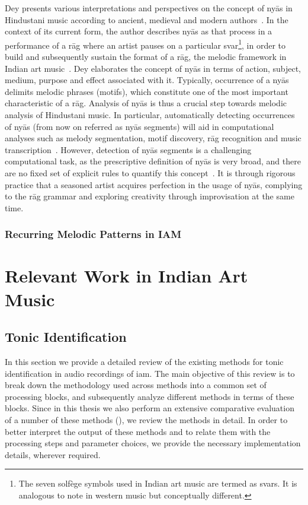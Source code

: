Dey presents various interpretations and perspectives on the concept of ny\={a}s in Hindustani music according to ancient, medieval and modern authors~\cite{Dey2008}. In the context of its current form, the author describes ny\={a}s as that process in a performance of a r\={a}g where an artist pauses on a particular svar\footnote{The seven solf\`{e}ge symbols used in Indian art music are termed as svars. It is analogous to note in western music but conceptually different.}, in order to build and subsequently sustain the format of a r\={a}g, the melodic framework in Indian art music~\cite[p. 70]{Dey2008}\cite{KKG_SS13}. Dey elaborates the concept of ny\={a}s in terms of action, subject, medium, purpose and effect associated with it. Typically, occurrence of a ny\={a}s delimits melodic phrases (motifs), which constitute one of the most important characteristic of a r\={a}g. Analysis of ny\={a}s is thus a crucial step towards melodic analysis of Hindustani music. In particular, automatically detecting occurrences of ny\={a}s (from now on referred as ny\={a}s segments) will aid in computational analyses such as melody segmentation, motif discovery, r\={a}g recognition and music transcription~\cite{GopalJNMR2012, Rao2014}. However, detection of ny\={a}s segments is a challenging computational task, as the prescriptive definition of ny\={a}s is very broad, and there are no fixed set of explicit rules to quantify this concept~\cite[p. 73]{Dey2008}. It is through rigorous practice that a seasoned artist acquires perfection in the usage of ny\={a}s, complying to the r\={a}g grammar and exploring creativity through improvisation at the same time. 

\subsubsection{Recurring Melodic Patterns in IAM}


\section{Relevant Work in Indian Art Music}
\label{sec:background_relevant_work_iam}


\subsection{Tonic Identification}
\label{sec:background_relevant_work_tonic_identification}

In this section we provide a detailed review of the existing methods for tonic identification in audio recordings of \gls{iam}. The main objective of this review is to break down the methodology used across methods into a common set of processing blocks, and subsequently analyze different methods in terms of these blocks. Since in this thesis we also perform an extensive comparative evaluation of a number of these methods (\secref{}), we review the methods in detail. In order to better interpret the output of these methods and to relate them with the processing steps and parameter choices, we provide the necessary implementation details, wherever required.


